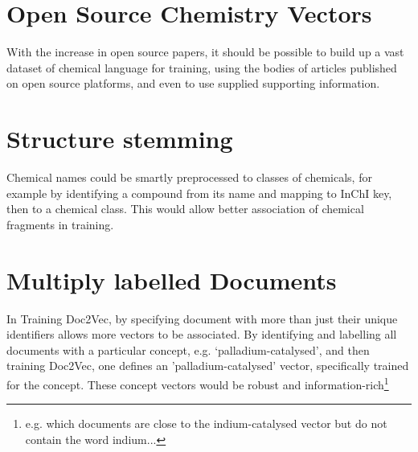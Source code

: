 \section{Open Source Chemistry Vectors}
With the increase in open source papers, it should be possible to build up a vast dataset of chemical language for training, using the bodies of articles published on open source platforms, and even to use supplied supporting information. 
\section{Structure stemming}
Chemical names could be smartly preprocessed to classes of chemicals, for example by identifying a compound from its name and mapping to InChI key, then to a chemical class. This would allow better association of chemical fragments in training.
\section{Multiply labelled Documents}
In Training Doc2Vec, by specifying document with more than just their unique identifiers allows more vectors to be associated. By identifying and labelling all documents with a particular concept, e.g. `palladium-catalysed', and then training Doc2Vec, one defines an 'palladium-catalysed' vector, specifically trained for the concept. These concept vectors would be robust and information-rich\footnote{e.g. which documents are close to the indium-catalysed vector but do not contain the word indium...}

